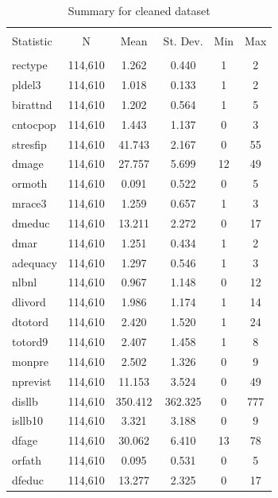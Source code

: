 \documentclass[a4paper, 12pt]{article}
\begin{document}
\begin{table}[!htbp] \centering 
  \caption{Summary for cleaned dataset} 
  \label{tab:cleanSummary} 
\begin{tabular}{@{\extracolsep{5pt}}lccccc} 
\\[-1.8ex]\hline 
\hline \\[-1.8ex] 
Statistic & \multicolumn{1}{c}{N} & \multicolumn{1}{c}{Mean} & \multicolumn{1}{c}{St. Dev.} & \multicolumn{1}{c}{Min} & \multicolumn{1}{c}{Max} \\ 
\hline \\[-1.8ex] 
rectype & 114,610 & 1.262 & 0.440 & 1 & 2 \\ 
pldel3 & 114,610 & 1.018 & 0.133 & 1 & 2 \\ 
birattnd & 114,610 & 1.202 & 0.564 & 1 & 5 \\ 
cntocpop & 114,610 & 1.443 & 1.137 & 0 & 3 \\ 
stresfip & 114,610 & 41.743 & 2.167 & 0 & 55 \\ 
dmage & 114,610 & 27.757 & 5.699 & 12 & 49 \\ 
ormoth & 114,610 & 0.091 & 0.522 & 0 & 5 \\ 
mrace3 & 114,610 & 1.259 & 0.657 & 1 & 3 \\ 
dmeduc & 114,610 & 13.211 & 2.272 & 0 & 17 \\ 
dmar & 114,610 & 1.251 & 0.434 & 1 & 2 \\ 
adequacy & 114,610 & 1.297 & 0.546 & 1 & 3 \\ 
nlbnl & 114,610 & 0.967 & 1.148 & 0 & 12 \\ 
dlivord & 114,610 & 1.986 & 1.174 & 1 & 14 \\ 
dtotord & 114,610 & 2.420 & 1.520 & 1 & 24 \\ 
totord9 & 114,610 & 2.407 & 1.458 & 1 & 8 \\ 
monpre & 114,610 & 2.502 & 1.326 & 0 & 9 \\ 
nprevist & 114,610 & 11.153 & 3.524 & 0 & 49 \\ 
disllb & 114,610 & 350.412 & 362.325 & 0 & 777 \\ 
isllb10 & 114,610 & 3.321 & 3.188 & 0 & 9 \\ 
dfage & 114,610 & 30.062 & 6.410 & 13 & 78 \\ 
orfath & 114,610 & 0.095 & 0.531 & 0 & 5 \\ 
dfeduc & 114,610 & 13.277 & 2.325 & 0 & 17 \\ 

\end{tabular}
\end{table}
\end{document}
